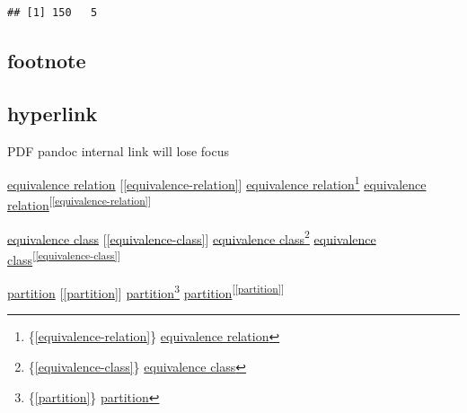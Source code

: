 \documentclass[
]{book}
\theoremstyle{definition}
\theoremstyle{definition}
\theoremstyle{definition}
\theoremstyle{definition}
\theoremstyle{remark}
\begin{document}
\begin{verbatim}
## [1] 150   5
\end{verbatim}

\hypertarget{footnote}{%
\subsection{footnote}\label{footnote}}

\hypertarget{hyperlink}{%
\subsection{hyperlink}\label{hyperlink}}

PDF pandoc internal link will lose focus

\protect\hyperlink{equivalence-relation}{equivalence relation} {[}\ref{equivalence-relation}{]} \protect\hyperlink{equivalence-relation}{equivalence relation}\footnote{\{\ref{equivalence-relation}\} \protect\hyperlink{equivalence-relation}{equivalence relation}} \protect\hyperlink{equivalence-relation}{equivalence relation}\textsuperscript{{[}\ref{equivalence-relation}{]}}

\protect\hyperlink{equivalence-class}{equivalence class} {[}\ref{equivalence-class}{]} \protect\hyperlink{equivalence-class}{equivalence class}\footnote{\{\ref{equivalence-class}\} \protect\hyperlink{equivalence-class}{equivalence class}} \protect\hyperlink{equivalence-class}{equivalence class}\textsuperscript{{[}\ref{equivalence-class}{]}}

\protect\hyperlink{partition}{partition} {[}\ref{partition}{]} \protect\hyperlink{partition}{partition}\footnote{\{\ref{partition}\} \protect\hyperlink{partition}{partition}} \protect\hyperlink{partition}{partition}\textsuperscript{{[}\ref{partition}{]}}
\end{document}
